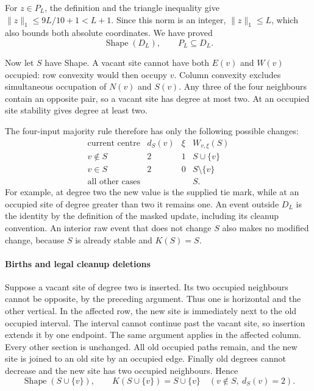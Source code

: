 \documentclass[
  11pt,
  a4paper,
]{article}
\begin{document}
For \(z\in P_L\), the definition and the triangle inequality give
\(\|z\|_1\le9L/10+1<L+1\). Since this norm is an integer,
\(\|z\|_1\le L\), which also bounds both absolute coordinates. We have
proved \[
\operatorname{Shape}(D_L),\qquad P_L\subseteq D_L.
\tag{G2}
\]

Now let \(S\) have Shape. A vacant site cannot have both \(E(v)\) and
\(W(v)\) occupied: row convexity would then occupy \(v\). Column
convexity excludes simultaneous occupation of \(N(v)\) and \(S(v)\). Any
three of the four neighbours contain an opposite pair, so a vacant site
has degree at most two. At an occupied site stability gives degree at
least two.

The four-input majority rule therefore has only the following possible
changes: \[
\begin{array}{c|c|c|c}
\text{current centre}&d_S(v)&\xi& W_{v,\xi}(S)\\ \hline
v\notin S&2&1&S\cup\{v\}\\
v\in S&2&0&S\setminus\{v\}\\
\text{all other cases}&&&S .
\end{array}
\tag{G3}
\] For example, at degree two the new value is the supplied tie mark,
while at an occupied site of degree greater than two it remains one. An
event outside \(D_L\) is the identity by the definition of the masked
update, including its cleanup convention. An interior raw event that
does not change \(S\) also makes no modified change, because \(S\) is
already stable and \(K(S)=S\).

\paragraph{Births and legal cleanup
deletions}\label{births-and-legal-cleanup-deletions}

Suppose a vacant site of degree two is inserted. Its two occupied
neighbours cannot be opposite, by the preceding argument. Thus one is
horizontal and the other vertical. In the affected row, the new site is
immediately next to the old occupied interval. The interval cannot
continue past the vacant site, so insertion extends it by one endpoint.
The same argument applies in the affected column. Every other section is
unchanged. All old occupied paths remain, and the new site is joined to
an old site by an occupied edge. Finally old degrees cannot decrease and
the new site has two occupied neighbours. Hence \[
\operatorname{Shape}(S\cup\{v\}),\qquad
K(S\cup\{v\})=S\cup\{v\}
\quad(v\notin S,\ d_S(v)=2).
\tag{G4}
\]
\end{document}
